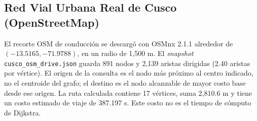 \subsection{Red Vial Urbana Real de Cusco (OpenStreetMap)}
El recorte OSM de conducción se descargó con OSMnx 2.1.1 alrededor de $(-13.5165,-71.9788)$, en un radio de 1,500 m. El \textit{snapshot} \texttt{cusco\_osm\_drive.json} guarda 891 nodos y 2,139 aristas dirigidas (2.40 aristas por vértice). El origen de la consulta es el nodo más próximo al centro indicado, no el centroide del grafo; el destino es el nodo alcanzable de mayor costo base desde ese origen. La ruta calculada contiene 17 vértices, suma 2,810.6 m y tiene un costo estimado de viaje de 387.197 s. Este costo no es el tiempo de cómputo de Dijkstra.
